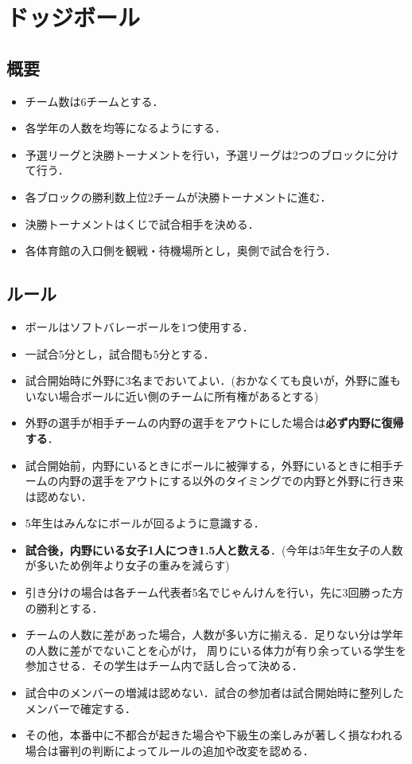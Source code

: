 \documentclass[dvipdfmx]{jsarticle}
\begin{document}
\section{ドッジボール}
\subsection{概要}
\begin{itemize}
  \item チーム数は6チームとする．
  \item 各学年の人数を均等になるようにする．
  \item 予選リーグと決勝トーナメントを行い，予選リーグは2つのブロックに分けて行う．
  \item 各ブロックの勝利数上位2チームが決勝トーナメントに進む．
  \item 決勝トーナメントはくじで試合相手を決める．
  \item 各体育館の入口側を観戦・待機場所とし，奥側で試合を行う．
\end{itemize}

\subsection{ルール}
\begin{itemize}
  \item ボールはソフトバレーボールを1つ使用する．
  \item 一試合5分とし，試合間も5分とする．
  \item 試合開始時に外野に3名までおいてよい．(おかなくても良いが，外野に誰もいない場合ボールに近い側のチームに所有権があるとする)
  \item 外野の選手が相手チームの内野の選手をアウトにした場合は{\bf 必ず内野に復帰する}．
  \item 試合開始前，内野にいるときにボールに被弾する，外野にいるときに相手チームの内野の選手をアウトにする以外のタイミングでの内野と外野に行き来は認めない．
  \item 5年生はみんなにボールが回るように意識する．
  \item {\bf 試合後，内野にいる女子1人につき1.5人と数える}．(今年は5年生女子の人数が多いため例年より女子の重みを減らす)
  \item 引き分けの場合は各チーム代表者5名でじゃんけんを行い，先に3回勝った方の勝利とする．
  \item チームの人数に差があった場合，人数が多い方に揃える．足りない分は学年の人数に差がでないことを心がけ，
        周りにいる体力が有り余っている学生を参加させる．その学生はチーム内で話し合って決める．
  \item 試合中のメンバーの増減は認めない．試合の参加者は試合開始時に整列したメンバーで確定する．
  \item その他，本番中に不都合が起きた場合や下級生の楽しみが著しく損なわれる場合は審判の判断によってルールの追加や改変を認める．
\end{itemize}
\end{document}

